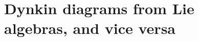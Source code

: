 \documentclass[a4paper,11pt]{article}
\theoremstyle{definition} %
\theoremstyle{plain} %
\theoremstyle{remark} %
\begin{document}
% 

%  

% 

% 

% 

% 

% 

% 

\setcounter{section}{15}

\section{Dynkin diagrams from Lie algebras, and vice versa}

\newpage
\end{document}
